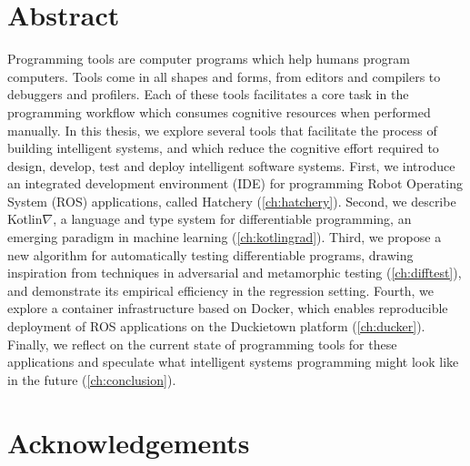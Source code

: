 \chapter*{Abstract}

Programming tools are computer programs which help humans program computers. Tools come in all shapes and forms, from editors and compilers to debuggers and profilers. Each of these tools facilitates a core task in the programming workflow which consumes cognitive resources when performed manually. In this thesis, we explore several tools that facilitate the process of building intelligent systems, and which reduce the cognitive effort required to design, develop, test and deploy intelligent software systems. First, we introduce an integrated development environment (IDE) for programming Robot Operating System (ROS) applications, called Hatchery (\autoref{ch:hatchery}). Second, we describe Kotlin$\nabla$, a language and type system for differentiable programming, an emerging paradigm in machine learning (\autoref{ch:kotlingrad}). Third, we propose a new algorithm for automatically testing differentiable programs, drawing inspiration from techniques in adversarial and metamorphic testing (\autoref{ch:difftest}), and demonstrate its empirical efficiency in the regression setting. Fourth, we explore a container infrastructure based on Docker, which enables reproducible deployment of ROS applications on the Duckietown platform (\autoref{ch:ducker}). Finally, we reflect on the current state of programming tools for these applications and speculate what intelligent systems programming might look like in the future (\autoref{ch:conclusion}).

\chapter*{Acknowledgements}

